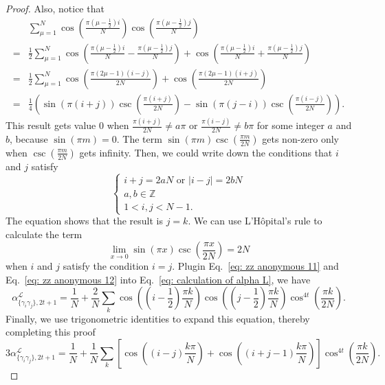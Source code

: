 \documentclass{article}
\newcommand{\alpl}{\alpha_{\{\gamma_i\gamma_j\}, 2t+1}^{\mathscr{L}}}
\begin{document}
\begin{proof}
Also, notice that
\begin{equation}
\label{eq: zz anonymous 12}
\begin{aligned}
& \sum_{\mu=1}^{N} \cos \left(\frac{\pi\left(\mu-\frac{1}{2}\right) i}{N}\right) \cos \left(\frac{\pi\left(\mu-\frac{1}{2}\right) j}{N}\right) \\
= & \frac{1}{2} \sum_{\mu=1}^{N} \cos \left(\frac{\pi\left(\mu-\frac{1}{2}\right) i}{N}-\frac{\pi\left(\mu-\frac{1}{2}\right) j}{N}\right)+\cos \left(\frac{\pi\left(\mu-\frac{1}{2}\right) i}{N}+\frac{\pi\left(\mu-\frac{1}{2}\right) j}{N}\right) \\
= & \frac{1}{2} \sum_{\mu=1}^{N} \cos \left(\frac{\pi(2 \mu-1)(i-j)}{2 N}\right)+\cos \left(\frac{\pi(2 \mu-1)(i+j)}{2 N}\right) \\
= & \frac{1}{4}\left(\sin (\pi(i+j)) \csc \left(\frac{\pi(i+j)}{2 N}\right)-\sin (\pi(j-i)) \csc \left(\frac{\pi(i-j)}{2 N}\right)\right).
\end{aligned}
\end{equation}
This result gets value $0$ when $\frac{\pi(i+j)}{2 N}\neq a \pi$ or $\frac{\pi(i-j)}{2 N}\neq b \pi$ for some integer $a$ and $b$, because $\sin(\pi m) = 0$. The term $ \sin(\pi m) \csc(\frac{\pi m}{2N})$ gets non-zero only when $\csc(\frac{\pi m}{2N})$ gets infinity. Then, we could write down the conditions that $i$ and $j$ satisfy
\begin{equation}
\left\{\begin{array}{l}
i+j=2 a N \text { or } |i-j|=2 b N \\
a, b \in \mathbb{Z} \\
1<i,j<N-1.
\end{array} \right.
\end{equation}
The equation shows that the result is $j=k$. We can use  L'Hôpital's rule to calculate the term
\begin{equation}
    \label{eq: zz anonymous 11}
    \lim_{x\to 0} \sin(\pi x) \csc(\frac{\pi x}{2N}) = 2N
\end{equation}
when $i$ and $j$ satisfy the condition $i=j$. Plugin Eq.~\eqref{eq: zz anonymous 11} and Eq.~\eqref{eq: zz anonymous 12} into Eq.~\eqref{eq: calculation of alpha L}, we have
\begin{equation}
    \label{eq: zz anonymous 13}
    \alpl = \frac{1}{N} + \frac{2}{N} \sum_k \cos \left(\left(i-\frac{1}{2}\right) \frac{\pi k}{N}\right)\cos \left(\left(j-\frac{1}{2}\right) \frac{\pi k}{N}\right)\cos ^{4 t}\left( \frac{\pi k}{2 N} \right).
\end{equation}
Finally, we use trigonometric identities to expand this equation, thereby completing this proof
\begin{equation}
    3\alpl=\frac{1}{N}+\frac{1}{N} \sum_k\left[\cos \left((i-j) \frac{k \pi}{N}\right)+\cos \left((i+j-1) \frac{k \pi}{N}\right)\right] \cos ^{4 t}\left(\frac{\pi k}{2 N}\right).
\end{equation}
\end{proof}
\end{document}
